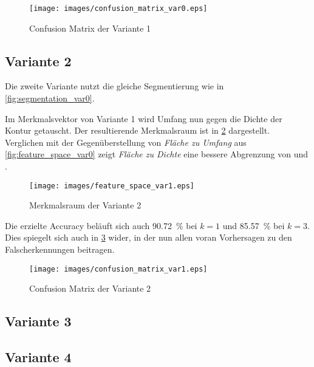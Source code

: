 \begin{figure}[ht]
    \centering
    \texttt{[image: images/confusion\_matrix\_var0.eps]}
    \caption{\foreignlanguage{english}{Confusion Matrix} der Variante 1\label{fig:confusion_matrix_var0}}
\end{figure}

\subsection{Variante 2}

Die zweite Variante nutzt die gleiche Segmentierung wie in \cref{fig:segmentation_var0}.

Im Merkmalsvektor von Variante 1 wird Umfang nun gegen die Dichte der Kontur getauscht. Der resultierende Merkmalsraum ist in \cref{fig:feature_space_var1} dargestellt. Verglichen mit der Gegenüberstellung von \emph{Fläche zu Umfang} aus \cref{fig:feature_space_var0} zeigt \emph{Fläche zu Dichte} eine bessere Abgrenzung von  und .

\begin{figure}[ht]
    \centering
    \texttt{[image: images/feature\_space\_var1.eps]}
    \caption{Merkmalsraum der Variante 2\label{fig:feature_space_var1}}
\end{figure}

Die erzielte \foreignlanguage{english}{Accuracy} beläuft sich auch \SI{90.72}{\percent} bei \(k = 1\) und \SI{85.57}{\percent} bei \(k = 3\). Dies spiegelt sich auch in \cref{fig:confusion_matrix_var1} wider, in der nun allen voran  Vorhersagen zu den Falscherkennungen beitragen.

\begin{figure}[ht]
    \centering
    \texttt{[image: images/confusion\_matrix\_var1.eps]}
    \caption{\foreignlanguage{english}{Confusion Matrix} der Variante 2\label{fig:confusion_matrix_var1}}
\end{figure}

\subsection{Variante 3}

\subsection{Variante 4}
